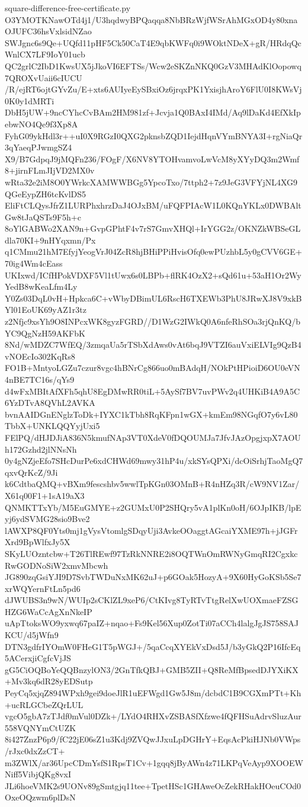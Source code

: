 \documentclass[11pt]{article}
\theoremstyle{definition}
\theoremstyle{remark}
\begin{document}
\begin{filecontents*}[overwrite]{square-difference-free-certificate.py}
O3YMOTKNawOTd4j1/U3hqdwyBPQaqqa8NbBRzWjfWSrAhMGxOD4y80xnaOJUFC36hsVxlsidNZao
SWJgnc6s9Qe+UQfd11pHF5Ck50CaT4E9qbKWFq0i9WOktNDeX+gR/HRdqQcWnlCX7LF9IoY01ucb
QC2grlC2IbD1KwsUX5jJkoVI6EFTSs/Wcw2eSKZnNKQ0GzV3MHAdKlOopowq7QROXvUaii6cIUCU
/R/ejRT6ojtGYvZu/E+xts6AUIyeEySBxiOz6jrqxPK1YxisjhAroY6FlU0I8KWsVj0K0y1dMRTi
DbH5jUW+9ncCYhcCvBAm2HM981zf+Jcvja1Q0BAxI4IMd/Aq9lDaKd4EfXkIpebwNO4Qe9f3Xp8A
FyhG09ykHdl3r++uI0X9RGzI0QXG2pknsbZQD1IejdHqnVYmBNYA3I+rgNiaQr3qYaeqPJwmgSZ4
X9/B7GdpqJ9jMQFn236/FOgF/X6NV8YTOHvamvoLwVcM8yXYyDQ3m2Wmf8+jirnFLmJIjVD2MX0v
wRta32e2iM8O0YWrkcXAMWWBGg5YpcoTxo/7ttph2+7z9JeG3VFYjNL4XG9QGeEypZH6tcKvlDS5
EliFtCLQysJfrZ1LURPhxhrzDaJ4OJxBM/uFQFPIAcW1L0KQnYKLx0DWBAltGw8tJaQSTs9F5h+c
8oYlGABWo2XAN9n+GvpGPhtF4v7rS7GmvXHQl+IrYGG2z/OKNZkWBSeGLdla70KI+9nHYqxmn/Px
q1CMmu21hM7EfyjYeogVrJ04ZcR8hjBHiPPiHvisOfq0ewPUzhbL5y0gCVV6GE+70ig4Wm4cEass
UKIxwd/ICfHPokVDXF5Vl1tUwx6s0LBPb+flRK4OzX2+sQd61u+53aH1Or2WyYedB8wKeaLfm4Ly
Y0Zs03DqL0vH+Hpkca6C+vWbyDBimUL6RscH6TXEWb3PhU8JRwXJ8V9xkBYl01EoUK69yAZ1r3tz
z2Nfjc9xsYh9O8INPcxWK8gyzFGRD//D1WzG2IWkQ0A6nfeRhSOa3rjQnKQ/bYC9QgNzH59AKFbK
8Nd/wMDZC7WfEQ/3zmqaUa5rTSbXdAws0vAt6bqJ9VTZI6auVxiELVIg9QzB4vNOEcIo302KqRs8
FO1B+MntyoLGZu7czur8vgc4hBNrCg866uo0mBAdqH/NOkPtHPioiD6OU0eVN4nBE7TC16s/qYs9
d4wFxMBItAfXFh5qhU8EgDMwRR0tiL+5AySf7BV7uvPWv2q4UHKiB4A9A5C6YzDTvA8QVhL2AVKA
bvnAAIDGnENglzToDk+IYXC1kTbh8RqKFpn1wGX+kmEm98NGqfO7y6vL80TbbX+UNKLQQYyjUxi5
FElPQ/dHJDJiA836N5kmufNAp3VT0XdeV0fDQOUMJa7JfvJAzOpgjxpX7AOUh172Gzhd2jlNNsNh
0y4gNZjeEfo7SHcDurPe6xdCHWd69mwy31hP4u/xkSYsQPXi/dcOiSrhjTaoMgQ7qxvQrKcZ/9Ji
k6CdtbaQMQ+vBXm9fescshbv5wwlTpKGn03OMnB+R4nHZq3R/cW9NV1Zar/X61q00F1+1sA19aX3
QNMKTTxYb/M5EuGMYE+z2GUMxU0P2SHQry5vA1plKn0oH/6OJpIKB/lpEyj6ydSVMG28sio9Bve2
lAWXP8QF0Yts0mj1gVysVtomlgSDqyUji3AvkeOOaggtAGcaiYXME97h+jJGFrXrd9BpWlfxJy5X
SKyLUOzntcbw+T26TlREwf97TzRkNNRE2i8OQTWnOmRWNyGmqRI2CgxkcRwGODNoSiW2xmvMbcwh
JG890zqGsiYJI9D7SvbTWDuNxMK62uJ+p6GOak5HozyA+9X60HyGoKSb5Se7xrWQYernFtLn5pd6
dJWUBS3n9wN/WUIp2sCKlZL9xeP6/CtKIvg8TyRTvTtgRelXwUOXmaeFZSGHZG6WaCcAgXnNkeIP
uApTtoksWO9yxwq67paIZ+nqao+Fs9Kel56Xup0ZotTi07aCCh4lalgJgJS758SAJKCU/d5jWfn9
DTN3gdfrIYOmW0FHeG1T5pWGJ+/5qaCcqXYEkVxDsd5J/b3yGkQ2P16IfcEq5ACerxjiCgfcVjJS
gG5CiOQBoYeQQBnzylON3/2GnTfkQBJ+GMB5ZII+Q8ReMfBpsedDJYXiKX+Mv3kq6dR28yEDSutp
PeyCq5xjqZ894WPxh9gei9doeJlR1uEFWgd1Gw5J8m/dcbdC1B9CGXmPTt+Kh+ucRLGCbeZQrLUL
vgcO5gbA7zTJdf0mVul0DZk+/LYdO4RHXvZSBASfXfzwe4fQFHSuAdrvSluzAur558VQNYmCtUZK
8i427ZnzP6p9/fC22jE06sZ1u3Kdj9ZVQwJJxuLpDGHrY+EqsAcPkiHJNb0VWps/rJxc0dxZzCT+
m3ZWlX/ar36UpcCDmYsfS1RpsT1Cv+1gqq8jByAWn4z71LKPqVeAyp9XOOEWNiff5VibjQKg8vxI
JLi6hoeVMK2s9UONv89gSmtgjq11tee+TpetHSc1GHAweOcZekRHakHOeuCOd0OxeOQzwm6plDsN

\end{filecontents*}
\end{document}
